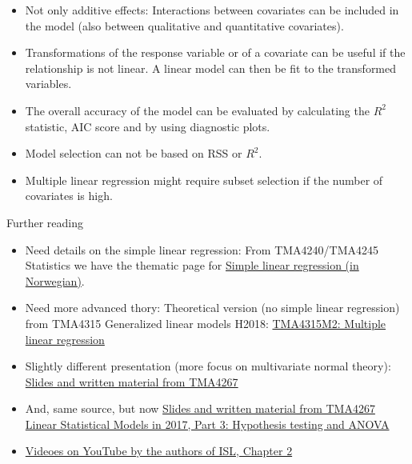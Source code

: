 \documentclass[10pt,ignorenonframetext,]{beamer}
\providecommand{\tightlist}{%
  \setlength{\itemsep}{0pt}\setlength{\parskip}{0pt}}
\begin{document}
\begin{frame}

\begin{itemize}
\item
  Not only additive effects: Interactions between covariates can be
  included in the model (also between qualitative and quantitative
  covariates).
\item
  Transformations of the response variable or of a covariate can be
  useful if the relationship is not linear. A linear model can then be
  fit to the transformed variables.
\item
  The overall accuracy of the model can be evaluated by calculating the
  \(R^2\) statistic, AIC score and by using diagnostic plots.
\item
  Model selection can not be based on RSS or \(R^2\).
\item
  Multiple linear regression might require subset selection if the
  number of covariates is high.
\end{itemize}

\end{frame}

\begin{frame}{ Further reading }

\begin{itemize}
\tightlist
\item
  Need details on the simple linear regression: From TMA4240/TMA4245
  Statistics we have the thematic page for
  \href{https://wiki.math.ntnu.no/tma4245/tema/begreper/regression}{Simple
  linear regression (in Norwegian)}.
\item
  Need more advanced thory: Theoretical version (no simple linear
  regression) from TMA4315 Generalized linear models H2018:
  \href{https://www.math.ntnu.no/emner/TMA4315/2018h/2MLR.html}{TMA4315M2:
  Multiple linear regression}
\item
  Slightly different presentation (more focus on multivariate normal
  theory):
  \href{https://www.math.ntnu.no/emner/TMA4267/2017v/TMA4267V2017Part2.pdf}{Slides
  and written material from TMA4267}
\item
  And, same source, but now
  \href{http://www.math.ntnu.no/emner/TMA4267/2017v/TMA4267V2017Part3.pdf}{Slides
  and written material from TMA4267 Linear Statistical Models in 2017,
  Part 3: Hypothesis testing and ANOVA}
\item
  \href{https://www.youtube.com/playlist?list=PL5-da3qGB5IBSSCPANhTgrw82ws7w_or9}{Videoes
  on YouTube by the authors of ISL, Chapter 2}
\end{itemize}

\end{frame}
\end{document}
